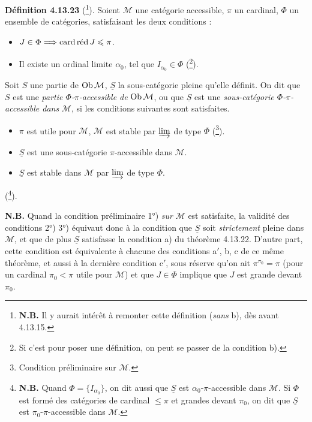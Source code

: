 \textbf{Définition 4.13.23} (\footnote{\textbf{N.B.} Il y aurait intérêt à remonter cette définition (\textit{sans} b), dès avant 4.13.15.}). Soient $\mathcal{M}$ une catégorie accessible, $\pi$ un cardinal, $\Phi$ un ensemble de catégories, satisfaisant les deux conditions :
\begin{itemize}[leftmargin=2.5em]
\item[a)] $J\in\Phi\Longrightarrow\cardred J\leqslant\pi$.
\item[b)] Il existe un ordinal limite $\alpha_0$, tel que $I_{\alpha_0}\in\Phi$ (\footnote{Si c'est pour poser une définition, on peut se passer de la condition b).}).
\end{itemize}
Soit $S$ une partie de $\Ob\mathcal{M}$, $\underline{S}$ la sous-catégorie pleine qu'elle définit. On dit que $S$ est une \textit{partie $\Phi$-$\pi$-accessible de} $\Ob\mathcal{M}$, ou que $\underline{S}$ est une \textit{sous-catégorie $\Phi$-$\pi$-accessible dans} $\mathcal{M}$, si les conditions suivantes sont satisfaites.
\begin{itemize}[leftmargin=2.5em]
\item[1°)] $\pi$ est utile pour $\mathcal{M}$, $\mathcal{M}$ est stable par $\varinjlim$ de type $\Phi$ (\footnote{Condition préliminaire sur $\mathcal{M}$.}).
\item[2°)] $\underline{S}$ est une sous-catégorie $\pi$-accessible dans $\mathcal{M}$.
\item[3°)] $\underline{S}$ est stable dans $\mathcal{M}$ par $\varinjlim$ de type $\Phi$.
\end{itemize}
(\footnote{\textbf{N.B.} Quand $\Phi=\{I_{\alpha_0}\}$, on dit aussi que $\underline{S}$ est $\alpha_0$-$\pi$-accessible dans $\mathcal{M}$. Si $\Phi$ est formé des catégories de cardinal $\leqslant\pi$ et grandes devant $\pi_0$, on dit que $\underline{S}$ est $\pi_0$-$\pi$-accessible dans $\mathcal{M}$.}).

\textbf{N.B.} Quand la condition préliminaire 1°) \textit{sur} $\mathcal{M}$ est satisfaite, la validité des conditions 2°) 3°) équivaut donc à la condition que $\underline{S}$ soit \textit{strictement} pleine dans $\mathcal{M}$, et que de
plus $\underline{S}$ satisfasse la condition a) du théorème 4.13.22. D'autre part, cette condition est équivalente à chacune des conditions a$'$, b, c de ce même théorème, et aussi à la dernière condition c$'$, sous réserve qu'on ait $\pi^{\pi_0}=\pi$ (pour un cardinal $\pi_0<\pi$ utile pour $\mathcal{M}$) et que $J\in\Phi$ implique que $J$ est grande devant $\pi_0$.

